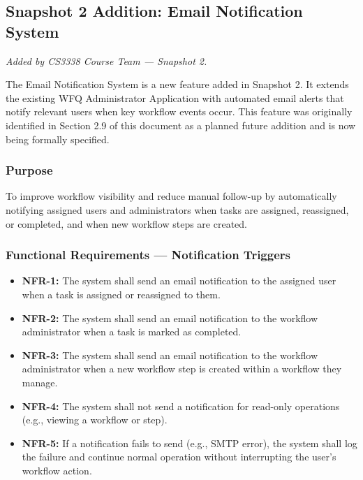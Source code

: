 \documentclass[12pt]{article}
\begin{document}
\subsection{Snapshot 2 Addition: Email Notification System}
\textit{Added by CS3338 Course Team --- Snapshot 2.}

The Email Notification System is a new feature added in Snapshot 2. It extends the existing
WFQ Administrator Application with automated email alerts that notify relevant users when
key workflow events occur. This feature was originally identified in Section 2.9 of this
document as a planned future addition and is now being formally specified.

\subsubsection{Purpose}
To improve workflow visibility and reduce manual follow-up by automatically notifying
assigned users and administrators when tasks are assigned, reassigned, or completed, and
when new workflow steps are created.

\subsubsection{Functional Requirements --- Notification Triggers}
\begin{itemize}
    \item \textbf{NFR-1:} The system shall send an email notification to the assigned user
    when a task is assigned or reassigned to them.
    \item \textbf{NFR-2:} The system shall send an email notification to the workflow
    administrator when a task is marked as completed.
    \item \textbf{NFR-3:} The system shall send an email notification to the workflow
    administrator when a new workflow step is created within a workflow they manage.
    \item \textbf{NFR-4:} The system shall not send a notification for read-only operations
    (e.g., viewing a workflow or step).
    \item \textbf{NFR-5:} If a notification fails to send (e.g., SMTP error), the system
    shall log the failure and continue normal operation without interrupting the user's
    workflow action.
\end{itemize}
\end{document}
